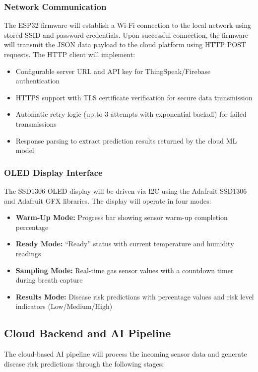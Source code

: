 \subsubsection*{Network Communication}
The ESP32 firmware will establish a Wi-Fi connection to the local network using stored SSID and password credentials. Upon successful connection, the firmware will transmit the JSON data payload to the cloud platform using HTTP POST requests. The HTTP client will implement:

\begin{itemize}[leftmargin=1.5cm]
\item Configurable server URL and API key for ThingSpeak/Firebase authentication
\item HTTPS support with TLS certificate verification for secure data transmission
\item Automatic retry logic (up to 3 attempts with exponential backoff) for failed transmissions
\item Response parsing to extract prediction results returned by the cloud ML model
\end{itemize}

\subsubsection*{OLED Display Interface}
The SSD1306 OLED display will be driven via I2C using the Adafruit SSD1306 and Adafruit GFX libraries. The display will operate in four modes:

\begin{itemize}[leftmargin=1.5cm]
\item \textbf{Warm-Up Mode:} Progress bar showing sensor warm-up completion percentage
\item \textbf{Ready Mode:} ``Ready'' status with current temperature and humidity readings
\item \textbf{Sampling Mode:} Real-time gas sensor values with a countdown timer during breath capture
\item \textbf{Results Mode:} Disease risk predictions with percentage values and risk level indicators (Low/Medium/High)
\end{itemize}

\subsection{Cloud Backend and AI Pipeline}
The cloud-based AI pipeline will process the incoming sensor data and generate disease risk predictions through the following stages:

